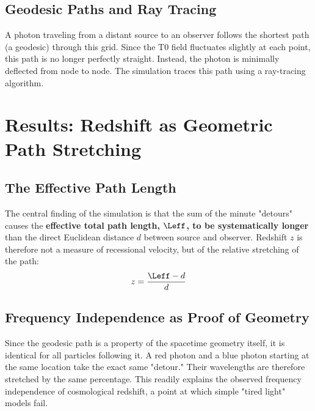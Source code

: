 	\subsection{Geodesic Paths and Ray Tracing}
	A photon traveling from a distant source to an observer follows the shortest path (a geodesic) through this grid. Since the T0 field fluctuates slightly at each point, this path is no longer perfectly straight. Instead, the photon is minimally deflected from node to node. The simulation traces this path using a ray-tracing algorithm.
	\section{Results: Redshift as Geometric Path Stretching}
	\subsection{The Effective Path Length}
	The central finding of the simulation is that the sum of the minute "detours" causes the \textbf{effective total path length, $\Leff$, to be systematically longer} than the direct Euclidean distance $d$ between source and observer.
	Redshift $z$ is therefore not a measure of recessional velocity, but of the relative stretching of the path:
	\begin{equation}
		z = \frac{\Leff - d}{d}
	\end{equation}
	\subsection{Frequency Independence as Proof of Geometry}
	Since the geodesic path is a property of the spacetime geometry itself, it is identical for all particles following it. A red photon and a blue photon starting at the same location take the exact same "detour." Their wavelengths are therefore stretched by the same percentage. This readily explains the observed frequency independence of cosmological redshift, a point at which simple "tired light" models fail.
